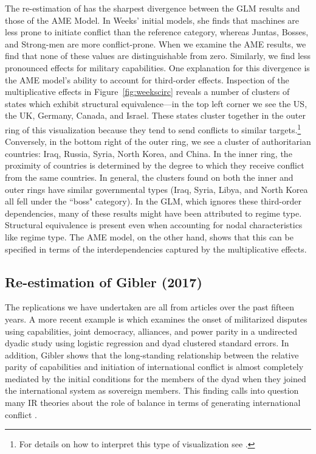 The re-estimation of \citet{weeks:2012} has the sharpest divergence between the GLM results and those of the AME Model. In Weeks' initial models,  she finds that machines are less prone to initiate conflict than the reference category, whereas Juntas, Bosses, and Strong-men are more conflict-prone. When we examine the AME results, we find that none of these values are distinguishable from zero. Similarly, we find less pronounced effects for military capabilities. One explanation for this divergence is the AME model's ability to account for third-order effects. Inspection of the multiplicative effects in Figure~\ref{fig:weekscirc} reveals a number of clusters of states which exhibit structural equivalence---in the top left corner we see the US, the UK, Germany, Canada, and Israel. These states cluster together in the outer ring of this visualization because they tend to send conflicts to similar targets.\footnote{For details on how to interpret this type of visualization see \citet{minhas:etal:2016:arxiv}.} Conversely, in the bottom right of the outer ring, we see a cluster of authoritarian countries: Iraq, Russia, Syria, North Korea, and China. In the inner ring, the proximity of countries is determined by the degree to which they receive conflict from the same countries. In general, the clusters found on both the inner and outer rings have similar governmental types (Iraq, Syria, Libya, and North Korea all fell under the ``boss" category). In the GLM, which ignores these third-order dependencies, many of these results might have been attributed to regime type. Structural equivalence is present even when accounting for nodal characteristics like regime type.  The AME model, on the other hand, shows that this can be specified in terms of the interdependencies captured by the multiplicative effects. 

\subsection{Re-estimation of Gibler (2017)}

The replications we have undertaken are all from articles over the past fifteen years.  A more recent example is \citet{gibler:2017} which examines the onset of militarized disputes using capabilities, joint democracy, alliances, and power parity in a undirected dyadic study using logistic regression and dyad clustered standard errors. In addition, Gibler shows that the long-standing relationship between the relative parity of capabilities and initiation of international conflict is almost completely mediated by the initial conditions for the members of the dyad when they joined the international system as sovereign members. This finding calls into question many IR theories about the role of balance in terms of generating international conflict \citep{organski:1958}.

